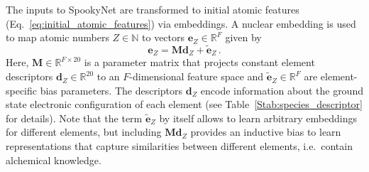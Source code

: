 \documentclass[%
superscriptaddress,
reprint,
nofootinbib,
amsmath,amssymb,amsfonts,
floatfix,
altaffilletter,
showkeys,
]{revtex4-2}
\newcommand{\nn}{SpookyNet}
\begin{document}
The inputs to \nn{} are transformed to initial atomic features (Eq.~\ref{eq:initial_atomic_features}) via embeddings. A nuclear embedding is used to map atomic numbers $Z\in\mathbb{N}$ to vectors $\mathbf{e}_Z\in\mathbb{R}^F$ given by
\begin{equation}
\mathbf{e}_Z =
\mathbf{M}\mathbf{d}_Z + \tilde{\mathbf{e}}_Z \,.
\label{eq:nuclear_embedding}
\end{equation}
Here, $\mathbf{M} \in \mathbb{R}^{F\times 20}$ is a parameter matrix that projects constant element descriptors $\mathbf{d}_Z\in \mathbb{R}^{20}$ to an $F$-dimensional feature space and $\tilde{\mathbf{e}}_Z \in \mathbb{R}^{F}$ are element-specific bias parameters. The descriptors $\mathbf{d}_Z$ encode information about the ground state electronic configuration of each element (see Table~\ref{Stab:species_descriptor} for details). Note that the term $\tilde{\mathbf{e}}_Z$ by itself allows to learn arbitrary embeddings for different elements, but including $\mathbf{M}\mathbf{d}_Z$ provides an inductive bias to learn representations that capture similarities between different elements, i.e.\ contain alchemical knowledge.
\end{document}
